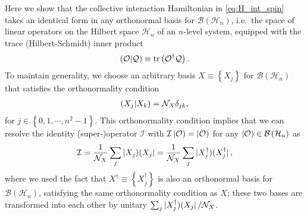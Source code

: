\documentclass[nofootinbib,notitlepage,11pt]{revtex4-2}
\newcommand{\f}[2]{\dfrac{#1}{#2}} %
\newcommand{\p}[1]{\left(#1\right)} %
\renewcommand{\set}[1]{\left\{#1\right\}} %
\newcommand{\1}{\mathds{1}}
\newcommand{\B}{\mathcal{B}}
\renewcommand{\H}{\mathcal{H}}
\newcommand{\I}{\mathcal{I}}
\newcommand{\N}{\mathcal{N}}
\renewcommand{\O}{\mathcal{O}}
\newcommand{\Q}{\mathcal{Q}}
\def\obra#1{\mathinner{({#1}|}}
\def\oket#1{\mathinner{|{#1})}}
\def\obk#1{\mathinner{({#1})}}
\def\oop#1#2{\oket{#1}\!\obra{#2}}
\begin{document}
Here we show that the collective interaction Hamiltonian in
\eqref{eq:H_int_spin} takes an identical form in any orthonormal basis
for $\B\p{\H_n}$, i.e.~the space of linear operators on the Hilbert
space $\H_n$ of an $n$-level system, equipped with the trace
(Hilbert-Schmidt) inner product
\begin{align}
  \obk{\O|\Q} \equiv \tr\p{\O^\dag \Q}.
\end{align}
To maintain generality, we choose an arbitrary basis
$X\equiv\set{X_j}$ for $\B\p{\H_n}$ that satisfies the orthonormality
condition
\begin{align}
  \obk{X_j|X_k} = \N_X \delta_{jk},
\end{align}
for $j\in\set{0,1,\cdots,n^2-1}$.  This orthonormality condition
implies that we can resolve the identity (super-)operator $\I$ with
$\I\oket{\O}=\oket{\O}$ for any $\oket\O\in\B\p{\H_n}$ as
\begin{align}
  \I = \f1{\N_X} \sum_j \oop{X_j}{X_j}
  = \f1{\N_X} \sum_j \oop{X_j^\dag}{X_j^\dag},
\end{align}
where we used the fact that $X^\dag\equiv\set{X_j^\dag}$ is also an
orthonormal basis for $\B\p{\H_n}$, satisfying the same orthonormality
condition as $X$; these two bases are transformed into each other by
unitary $\sum_j\oop{X_j^\dag}{X_j}/\N_X$.
\end{document}
